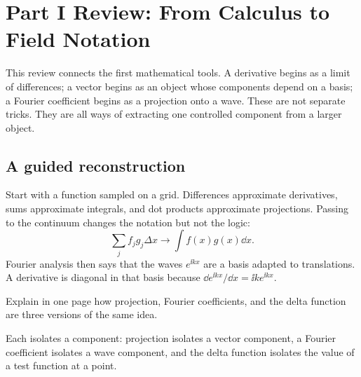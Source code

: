 
\chapter{Part I Review: From Calculus to Field Notation}

This review connects the first mathematical tools.  A derivative begins as a limit of differences; a vector begins as an object whose components depend on a basis; a Fourier coefficient begins as a projection onto a wave.  These are not separate tricks.  They are all ways of extracting one controlled component from a larger object.

\section{A guided reconstruction}













Start with a function sampled on a grid.  Differences approximate derivatives, sums approximate integrals, and dot products approximate projections.  Passing to the continuum changes the notation but not the logic:
\[
  \sum_j f_jg_j\Delta x\longrightarrow \int f(x)g(x)\dd x.
\]
Fourier analysis then says that the waves \(e^{\ii kx}\) are a basis adapted to translations.  A derivative is diagonal in that basis because \(\dd e^{\ii kx}/\dd x=\ii k e^{\ii kx}\).

\begin{exercise}
Explain in one page how projection, Fourier coefficients, and the delta function are three versions of the same idea.
\begin{answer}
Each isolates a component: projection isolates a vector component, a Fourier coefficient isolates a wave component, and the delta function isolates the value of a test function at a point.
\end{answer}
\end{exercise}
